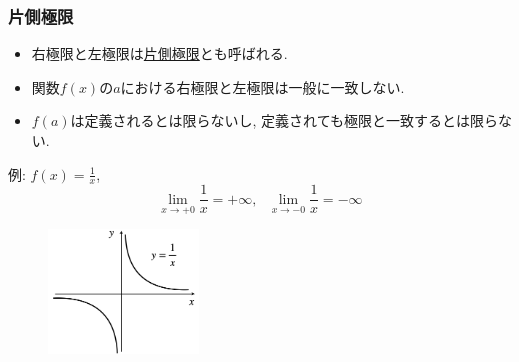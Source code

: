 \documentclass[dvipdfmx,cjk,10.2pt]{beamer}
\theoremstyle{definition}
\begin{document}


\begin{frame}
\frametitle{片側極限}

\begin{itemize}
\item 右極限と左極限は\underline{片側極限}とも呼ばれる. 
\item 関数$f(x)$の$a$における右極限と左極限は一般に一致しない. 
\item $f(a)$は定義されるとは限らないし, 定義されても極限と一致するとは限らない. 
\end{itemize}
例: $f(x)=\frac{1}{x}$, \vspace{-2mm}
$$
\lim_{x \to +0}\frac{1}{x}= +\infty, \ \ \ \lim_{x \to -0}\frac{1}{x}=-\infty
$$

\vspace{-3mm}

 \begin{figure}[htbp]
 \begin{center} 
  \includegraphics[width=40mm]{xinv.png}
 \end{center}
\end{figure}

\vspace{-3mm}

\end{frame}





\end{document}
